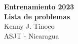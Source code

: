 \begin{center}
{
    \textbf{\Large Entrenamiento 2023 \\ \vspace{2mm} Lista de problemas} \vspace{5mm} \\
    {\large Kenny J. Tinoco} \vspace{3mm} \\
    ASJT - Nicaragua
}
\end{center}

\thispagestyle{first-page-style}